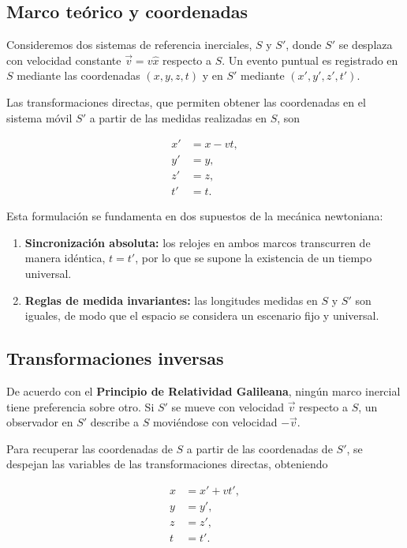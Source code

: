 \subsection{Marco teórico y coordenadas}

Consideremos dos sistemas de referencia inerciales, $S$ y $S'$, donde $S'$ se desplaza con velocidad constante $\vec{v}=v\hat{x}$ respecto a $S$. Un evento puntual es registrado en $S$ mediante las coordenadas $(x,y,z,t)$ y en $S'$ mediante $(x',y',z',t')$.



Las transformaciones directas, que permiten obtener las coordenadas en el sistema móvil $S'$ a partir de las medidas realizadas en $S$, son

\begin{align*}
    x' &= x-vt, \\
    y' &= y, \\
    z' &= z, \\
    t' &= t.
\end{align*}

Esta formulación se fundamenta en dos supuestos de la mecánica newtoniana:

\begin{enumerate}
    \item \textbf{Sincronización absoluta:} los relojes en ambos marcos transcurren de manera idéntica, $t=t'$, por lo que se supone la existencia de un tiempo universal.

    \item \textbf{Reglas de medida invariantes:} las longitudes medidas en $S$ y $S'$ son iguales, de modo que el espacio se considera un escenario fijo y universal.
\end{enumerate}

\subsection{Transformaciones inversas}

De acuerdo con el \textbf{Principio de Relatividad Galileana}, ningún marco inercial tiene preferencia sobre otro. Si $S'$ se mueve con velocidad $\vec{v}$ respecto a $S$, un observador en $S'$ describe a $S$ moviéndose con velocidad $-\vec{v}$.

Para recuperar las coordenadas de $S$ a partir de las coordenadas de $S'$, se despejan las variables de las transformaciones directas, obteniendo

\begin{align*}
    x &= x'+vt', \\
    y &= y', \\
    z &= z', \\
    t &= t'.
\end{align*}

